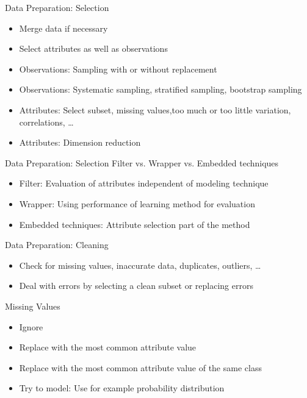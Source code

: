 \documentclass{beamer}
\begin{document}
		\begin{frame}{Data Preparation: Selection}
			\begin{itemize}
				\item Merge data if necessary
				\item Select attributes as well as observations
				\item Observations: Sampling with or without replacement
				\item Observations: Systematic sampling, stratified sampling, bootstrap sampling
				\item Attributes: Select subset, missing values,too much or too little variation, correlations, \dots
				\item Attributes: Dimension reduction
               \end{itemize}
		\end{frame}

		\begin{frame}{Data Preparation: Selection}
			Filter vs. Wrapper vs. Embedded techniques
            \begin{itemize}
				\item Filter: Evaluation of attributes independent of modeling technique
				\item Wrapper: Using performance of learning method for evaluation
				\item Embedded techniques: Attribute selection part of the method
			\end{itemize}
		\end{frame}

		\begin{frame}{Data Preparation: Cleaning}
			\begin{itemize}
				\item Check for missing values, inaccurate data, duplicates, outliers, \dots
				\item Deal with errors by selecting a clean subset or replacing errors			
			\end{itemize}
            \bigskip
			Missing Values
			\begin{itemize}
				\item Ignore
				\item Replace with the most common attribute value
				\item Replace with the most common attribute value of the same class
				\item Try to model: Use for example probability distribution
            \end{itemize}
		\end{frame}
		
\end{document}
